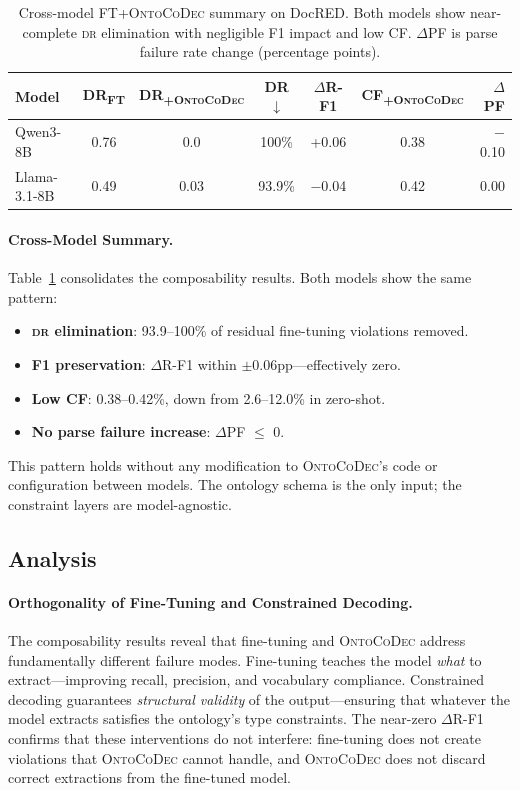 \documentclass[11pt,a4paper]{article}
\newcommand{\sys}{\textsc{OntoCoDec}}
\newcommand{\DR}{\textsc{dr}}
\begin{document}
\begin{table}[t]
\centering
\small
\caption{Cross-model FT+\sys{} summary on DocRED. Both models show near-complete \DR{} elimination with negligible F1 impact and low CF. $\Delta$PF is parse failure rate change (percentage points).}
\label{tab:cross-model}
\begin{tabular}{@{}lcccccr@{}}
\toprule
\textbf{Model} & \textbf{DR\textsubscript{FT}} & \textbf{DR\textsubscript{+\sys{}}} & \textbf{DR$\downarrow$} & \textbf{$\Delta$R-F1} & \textbf{CF\textsubscript{+\sys{}}} & \textbf{$\Delta$PF} \\
\midrule
Qwen3-8B & 0.76 & 0.0 & 100\% & +0.06 & 0.38 & $-$0.10 \\
Llama-3.1-8B & 0.49 & 0.03 & 93.9\% & $-$0.04 & 0.42 & \phantom{$-$}0.00 \\
\bottomrule
\end{tabular}
\end{table}

\paragraph{Cross-Model Summary.}
Table~\ref{tab:cross-model} consolidates the composability results. Both models show the same pattern:
\begin{itemize}[nosep,leftmargin=*]
    \item \textbf{\DR{} elimination}: 93.9--100\% of residual fine-tuning violations removed.
    \item \textbf{F1 preservation}: $\Delta$R-F1 within $\pm$0.06pp---effectively zero.
    \item \textbf{Low CF}: 0.38--0.42\%, down from 2.6--12.0\% in zero-shot.
    \item \textbf{No parse failure increase}: $\Delta$PF $\leq$ 0.
\end{itemize}
This pattern holds without any modification to \sys{}'s code or configuration between models. The ontology schema is the only input; the constraint layers are model-agnostic.

\subsection{Analysis}
\label{sec:analysis}

\paragraph{Orthogonality of Fine-Tuning and Constrained Decoding.}
The composability results reveal that fine-tuning and \sys{} address fundamentally different failure modes. Fine-tuning teaches the model \emph{what} to extract---improving recall, precision, and vocabulary compliance. Constrained decoding guarantees \emph{structural validity} of the output---ensuring that whatever the model extracts satisfies the ontology's type constraints. The near-zero $\Delta$R-F1 confirms that these interventions do not interfere: fine-tuning does not create violations that \sys{} cannot handle, and \sys{} does not discard correct extractions from the fine-tuned model.
\end{document}
